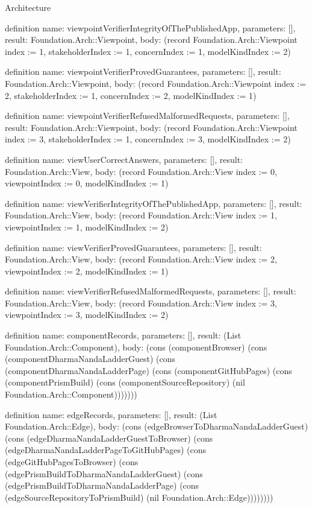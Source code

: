\begin{lexlean}{Architecture}
\begin{semanticmodule}
definition{
  name: viewpointVerifierIntegrityOfThePublishedApp,
  parameters: [],
  result: Foundation.Arch::Viewpoint,
  body: (record Foundation.Arch::Viewpoint {index := 1, stakeholderIndex := 1, concernIndex := 1, modelKindIndex := 2})
}

definition{
  name: viewpointVerifierProvedGuarantees,
  parameters: [],
  result: Foundation.Arch::Viewpoint,
  body: (record Foundation.Arch::Viewpoint {index := 2, stakeholderIndex := 1, concernIndex := 2, modelKindIndex := 1})
}

definition{
  name: viewpointVerifierRefusedMalformedRequests,
  parameters: [],
  result: Foundation.Arch::Viewpoint,
  body: (record Foundation.Arch::Viewpoint {index := 3, stakeholderIndex := 1, concernIndex := 3, modelKindIndex := 2})
}

definition{
  name: viewUserCorrectAnswers,
  parameters: [],
  result: Foundation.Arch::View,
  body: (record Foundation.Arch::View {index := 0, viewpointIndex := 0, modelKindIndex := 1})
}

definition{
  name: viewVerifierIntegrityOfThePublishedApp,
  parameters: [],
  result: Foundation.Arch::View,
  body: (record Foundation.Arch::View {index := 1, viewpointIndex := 1, modelKindIndex := 2})
}

definition{
  name: viewVerifierProvedGuarantees,
  parameters: [],
  result: Foundation.Arch::View,
  body: (record Foundation.Arch::View {index := 2, viewpointIndex := 2, modelKindIndex := 1})
}

definition{
  name: viewVerifierRefusedMalformedRequests,
  parameters: [],
  result: Foundation.Arch::View,
  body: (record Foundation.Arch::View {index := 3, viewpointIndex := 3, modelKindIndex := 2})
}

definition{
  name: componentRecords,
  parameters: [],
  result: (List Foundation.Arch::Component),
  body: (cons (componentBrowser) (cons (componentDharmaNandaLadderGuest) (cons (componentDharmaNandaLadderPage) (cons (componentGitHubPages) (cons (componentPrismBuild) (cons (componentSourceRepository) (nil Foundation.Arch::Component)))))))
}

definition{
  name: edgeRecords,
  parameters: [],
  result: (List Foundation.Arch::Edge),
  body: (cons (edgeBrowserToDharmaNandaLadderGuest) (cons (edgeDharmaNandaLadderGuestToBrowser) (cons (edgeDharmaNandaLadderPageToGitHubPages) (cons (edgeGitHubPagesToBrowser) (cons (edgePrismBuildToDharmaNandaLadderGuest) (cons (edgePrismBuildToDharmaNandaLadderPage) (cons (edgeSourceRepositoryToPrismBuild) (nil Foundation.Arch::Edge))))))))
}


\end{semanticmodule}
\end{lexlean}
